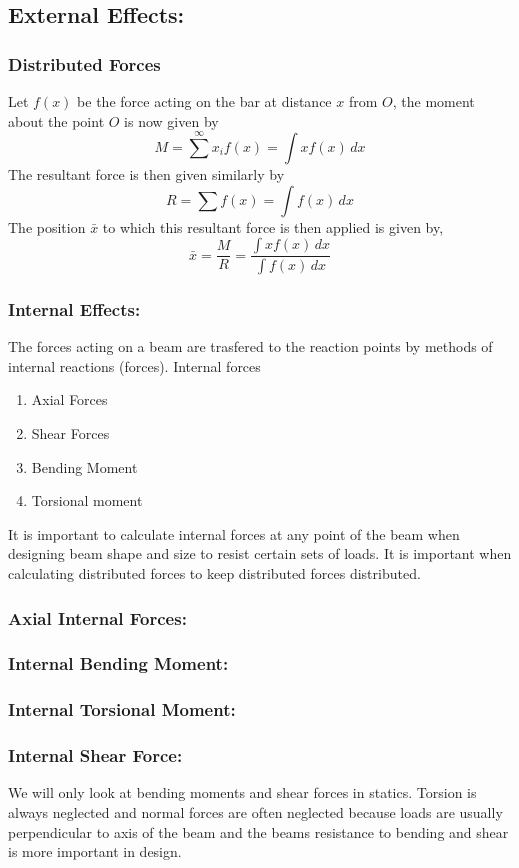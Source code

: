 \documentclass[14pt]{article}
\begin{document}
    \subsection{External Effects:}
    \subsubsection{Distributed Forces}
    Let $f(x)$ be the force acting on the bar at distance $x$ from $O$,
    the moment about the point $O$ is now given by
    $$M=\sum\limits^\infty x_i f(x)=\int x f(x)\, dx$$ The resultant
    force is then given similarly by
    $$R=\sum f(x)=\int f(x)\, dx$$ The position $\bar x$ to which this
    resultant force is then applied is given by,
    $$\bar x=\frac{M}{R}=\frac{\int x f(x)\, dx}{\int f(x)\, dx}$$
    \subsubsection{Internal Effects:}
    The forces acting on a beam are trasfered to the reaction points by
    methods of internal reactions (forces). Internal forces
    \begin{enumerate}
        \item Axial Forces
        \item Shear Forces
        \item Bending Moment
        \item Torsional moment
    \end{enumerate}
    It is important to calculate internal forces at any point of the
    beam when designing beam shape and size to resist certain sets of
    loads. It is important when calculating distributed forces to keep
    distributed forces distributed.
    \subsubsection{Axial Internal Forces:}
    \subsubsection{Internal Bending Moment:}
    \subsubsection{Internal Torsional Moment:}
    \subsubsection{Internal Shear Force:}
    We will only look at bending moments and shear forces in statics.
    Torsion is always neglected and normal forces are often neglected
    because loads are usually perpendicular to axis of the beam and the
    beams resistance to bending and shear is more important in design.
\end{document}
